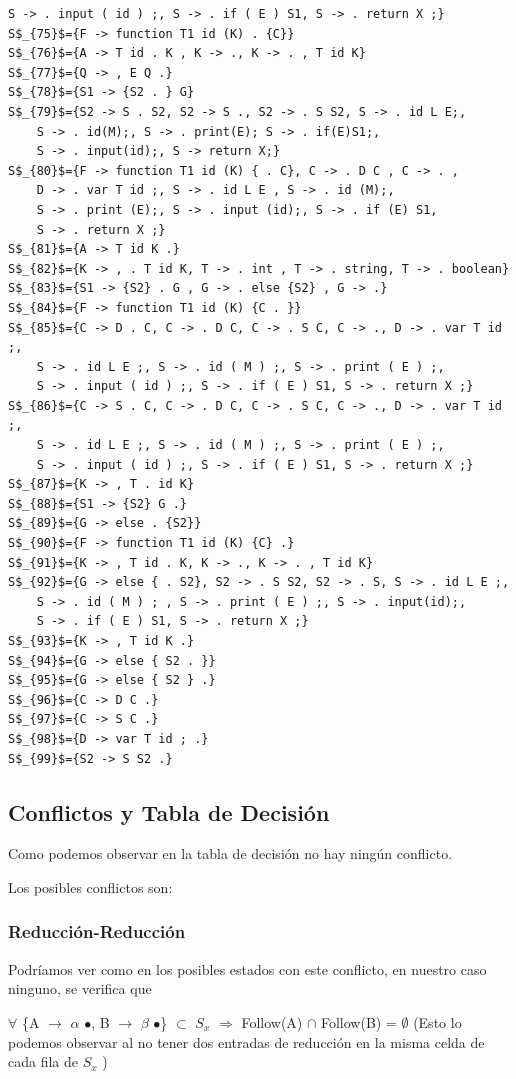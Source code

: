 \documentclass[a4paper, 12pt]{article}
\begin{document}
\begin{lstlisting}[style =EstadosAutomataST]
	S -> . input ( id ) ;, S -> . if ( E ) S1, S -> . return X ;}
S$_{75}$={F -> function T1 id (K) . {C}}
S$_{76}$={A -> T id . K , K -> ., K -> . , T id K}
S$_{77}$={Q -> , E Q .}
S$_{78}$={S1 -> {S2 . } G}
S$_{79}$={S2 -> S . S2, S2 -> S ., S2 -> . S S2, S -> . id L E;,
	S -> . id(M);, S -> . print(E); S -> . if(E)S1;,
	S -> . input(id);, S -> return X;}
S$_{80}$={F -> function T1 id (K) { . C}, C -> . D C , C -> . ,
	D -> . var T id ;, S -> . id L E , S -> . id (M);,
	S -> . print (E);, S -> . input (id);, S -> . if (E) S1,
	S -> . return X ;}
S$_{81}$={A -> T id K .}
S$_{82}$={K -> , . T id K, T -> . int , T -> . string, T -> . boolean}
S$_{83}$={S1 -> {S2} . G , G -> . else {S2} , G -> .}
S$_{84}$={F -> function T1 id (K) {C . }}
S$_{85}$={C -> D . C, C -> . D C, C -> . S C, C -> ., D -> . var T id ;,
	S -> . id L E ;, S -> . id ( M ) ;, S -> . print ( E ) ;,
	S -> . input ( id ) ;, S -> . if ( E ) S1, S -> . return X ;}
S$_{86}$={C -> S . C, C -> . D C, C -> . S C, C -> ., D -> . var T id ;,
	S -> . id L E ;, S -> . id ( M ) ;, S -> . print ( E ) ;,
	S -> . input ( id ) ;, S -> . if ( E ) S1, S -> . return X ;}
S$_{87}$={K -> , T . id K}
S$_{88}$={S1 -> {S2} G .}
S$_{89}$={G -> else . {S2}}
S$_{90}$={F -> function T1 id (K) {C} .}
S$_{91}$={K -> , T id . K, K -> ., K -> . , T id K}
S$_{92}$={G -> else { . S2}, S2 -> . S S2, S2 -> . S, S -> . id L E ;,
	S -> . id ( M ) ; , S -> . print ( E ) ;, S -> . input(id);,
	S -> . if ( E ) S1, S -> . return X ;}
S$_{93}$={K -> , T id K .}  
S$_{94}$={G -> else { S2 . }}
S$_{95}$={G -> else { S2 } .}
S$_{96}$={C -> D C .}
S$_{97}$={C -> S C .}
S$_{98}$={D -> var T id ; .}
S$_{99}$={S2 -> S S2 .}
\end{lstlisting}

\subsection{Conflictos y Tabla de Decisión}
Como podemos observar en la tabla de decisión no hay ningún conflicto.

Los posibles conflictos son:
	\subsubsection*{Reducción-Reducción}
	Podríamos ver como en los posibles estados con este conflicto, en nuestro caso ninguno, se verifica que 
	
	$\forall$ \{A $\rightarrow$ $\alpha$ $\bullet$, B $\rightarrow$ $\beta$ $\bullet$\} $\subset$ $S_x$ $\Rightarrow$ Follow(A) $\cap$ Follow(B) = $\emptyset$ (Esto lo podemos observar al no tener dos entradas de reducción en la misma celda de cada fila de $S_x$ )
	
\end{document}
